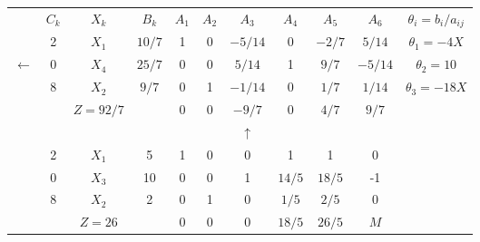     \begin{tabular}{ccccccccccc}
\cline{2-11}            & $C_k$   & $X_k$   & $B_k$   & $A_1$   & $A_2$   & $A_3$   & $A_4$   & $A_5$   & $A_6$   & $\theta_i = b_i/a_{ij}$ \bigstrut\\
\cline{2-11}            & 2       & $X_1$   & $10/7$  & 1       & 0       & $-5/14$ & 0       & $-2/7$  & $5/14$  & $\theta_1 = -4X$ \bigstrut[t]\\
    $\leftarrow$ & 0       & \textcolor[rgb]{ 1,  0,  0}{\boldmath{}\textbf{$X_4$}\unboldmath{}} & $25/7$  & 0       & 0       & \boldmath{}\textbf{$5/14$}\unboldmath{} & 1       & $9/7$   & $-5/14$ & \boldmath{}\textbf{$\theta_2 = 10$}\unboldmath{} \\
            & 8       & $X_2$   & $9/7$   & 0       & 1       & $-1/14$ & 0       & $1/7$   & $1/14$  & $\theta_3 = -18X$ \bigstrut[b]\\
\cline{2-11}            &         & $Z=92/7$ &         & 0       & 0       & \textcolor[rgb]{ 0,  .439,  .753}{\boldmath{}\textbf{$-9/7$}\unboldmath{}} & 0       & $4/7$   & $9/7$   &  \bigstrut\\
\cline{2-11}            &         &         &         &         &         & $\uparrow$ &         &         &         &  \bigstrut\\
\cline{2-11}            & 2       & $X_1$   & 5       & 1       & 0       & 0       & 1       & 1       & 0       &  \bigstrut[t]\\
            & 0       & $X_3$   & 10      & 0       & 0       & 1       & $14/5$  & $18/5$  & -1      &  \\
            & 8       & $X_2$   & 2       & 0       & 1       & 0       & $1/5$   & $2/5$   & 0       &  \bigstrut[b]\\
\cline{2-11}            &         & $Z=26$  &         & 0       & 0       & 0       & $18/5$  & $26/5$  & $M$     &  \bigstrut\\
\cline{2-11}    \end{tabular}%
